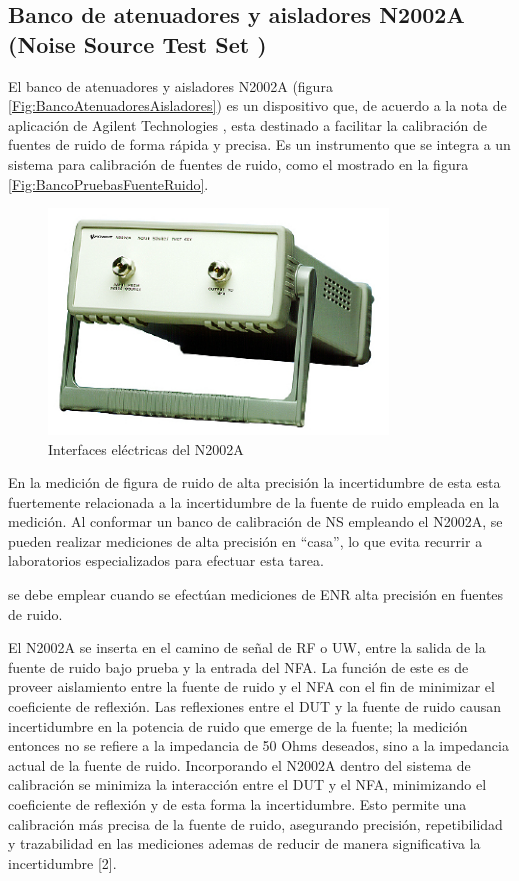 \subsection{Banco de atenuadores y aisladores N2002A (Noise Source Test Set )}
El banco de atenuadores y aisladores N2002A (figura \ref{Fig:BancoAtenuadoresAisladores}) es un dispositivo que, de acuerdo a la nota de aplicación de Agilent Technologies \cite{AGI02}, esta destinado a facilitar la calibración de fuentes de ruido de forma rápida y precisa. Es un instrumento que se integra a un sistema para calibración de fuentes de ruido, como el mostrado en la figura \ref{Fig:BancoPruebasFuenteRuido}. 		

\begin{figure}[h!]
	\centering
	\includegraphics[height=6cm]{./Imagenes/BancoAtenuadoresAisladoresN2002.pdf}
	\caption{Interfaces eléctricas del N2002A}			
	\label{Fig:BancoAtenuadoresAisladoresN2002.pdf}
\end{figure}

En la medición de figura de ruido de alta precisión la incertidumbre de esta esta fuertemente relacionada a la incertidumbre de la fuente de ruido empleada en la medición. Al conformar un banco de calibración de NS empleando el N2002A, se pueden realizar mediciones de alta precisión en “casa”, lo que evita recurrir a laboratorios especializados	para efectuar esta tarea.

se debe emplear cuando se efectúan mediciones de ENR alta precisión en fuentes de ruido.

El N2002A se inserta en el camino de señal de RF o UW, entre la salida de la fuente de ruido bajo prueba y la entrada	del NFA. La función de este es de proveer aislamiento entre la fuente de ruido y el NFA con el fin de minimizar el	coeficiente de reflexión. Las reflexiones entre el DUT y la fuente de ruido causan incertidumbre en la potencia de ruido que emerge de la fuente; la medición entonces no se refiere a la impedancia de 50 Ohms deseados, sino a la impedancia actual de la fuente de ruido. Incorporando el N2002A dentro del sistema de calibración se minimiza la interacción entre el DUT y el NFA, minimizando el coeficiente de reflexión y de esta forma la incertidumbre. Esto
permite una calibración más precisa de la fuente de ruido, asegurando precisión, repetibilidad y trazabilidad en las	mediciones ademas de reducir de manera significativa la incertidumbre [2].	

